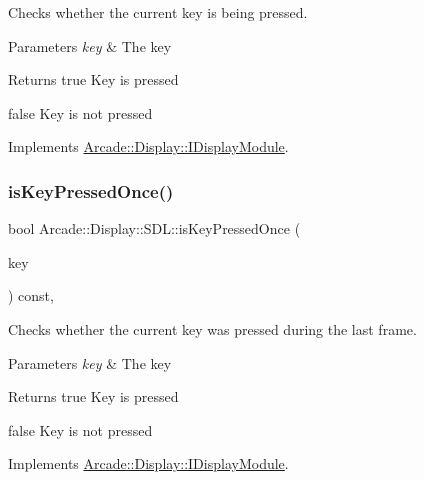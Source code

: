 Checks whether the current key is being pressed. 


\begin{DoxyParams}{Parameters}
{\em key} & The key \\
\hline
\end{DoxyParams}
\begin{DoxyReturn}{Returns}
true Key is pressed 

false Key is not pressed 
\end{DoxyReturn}


Implements \mbox{\hyperlink{classArcade_1_1Display_1_1IDisplayModule_af871661ff84c21581cd7233ba6f27aa0}{Arcade\+::\+Display\+::\+I\+Display\+Module}}.

\mbox{\label{classArcade_1_1Display_1_1SDL_a14dd612e3902b1daa1d31cca71efcf00}} 
\subsubsection{\texorpdfstring{isKeyPressedOnce()}{isKeyPressedOnce()}}
{\footnotesize\ttfamily bool Arcade\+::\+Display\+::\+S\+D\+L\+::is\+Key\+Pressed\+Once (\begin{DoxyParamCaption}\item[{\mbox{\hyperlink{classArcade_1_1Display_1_1IDisplayModule_a8da3f6b309ca0581473ae8cc8789b619}{I\+Display\+Module\+::\+Keys}}}]{key }\end{DoxyParamCaption}) const\hspace{0.3cm}{\ttfamily [final]}, {\ttfamily [virtual]}}



Checks whether the current key was pressed during the last frame. 


\begin{DoxyParams}{Parameters}
{\em key} & The key \\
\hline
\end{DoxyParams}
\begin{DoxyReturn}{Returns}
true Key is pressed 

false Key is not pressed 
\end{DoxyReturn}


Implements \mbox{\hyperlink{classArcade_1_1Display_1_1IDisplayModule_a531b700b332e077d9b714bafac05ebe1}{Arcade\+::\+Display\+::\+I\+Display\+Module}}.

